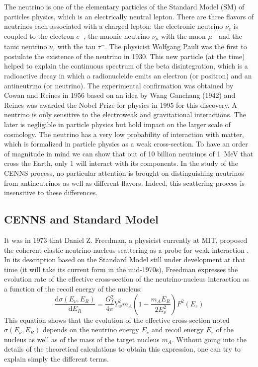 The neutrino is one of the elementary particles of the Standard Model (SM) of particles physics, which is an electrically neutral lepton. There are three flavors of neutrinos each associated with a charged lepton: the electronic neutrino $\nu_e$ is coupled to the electron $e^-$, the muonic neutrino $\nu_{\mu}$ with the muon $\mu^-$ and the tauic neutrino $\nu_{\tau}$ with the tau $\tau^-$.
The physicist Wolfgang Pauli was the first to postulate the existence of the neutrino in 1930. This new particle (at the time) helped to explain the continuous spectrum of the beta disintegration, which is a radioactive decay in which a radionucleide emits an electron (or positron) and an antineutrino (or neutrino).
The experimental confirmation was obtained by Cowan and Reines in 1956 based on an idea by Wang Ganchang (1942) and Reines was awarded the Nobel Prize for physics in 1995 for this discovery.
A neutrino is only sensitive to the electroweak and gravitational interactions. The later is negligible in particle physics but hold impact on the larger scale of cosmology. 
The neutrino has a very low probability of interaction with matter, which is formalized in particle physics as a weak cross-section. To have an order of magnitude in mind we can show that out of 10 billion neutrinos of \SI{1}{\mega\eV} that cross the Earth, only 1 will interact with its components.
In the study of the CENNS process, no particular attention is brought on distinguishing  neutrinos from antineutrinos as well as different flavors. Indeed, this scattering process is insensitive to these differences. 


\subsection{CENNS and Standard Model}

It was in 1973 that Daniel Z. Freedman, a physicist currently at MIT, proposed the coherent elastic neutrino-nucleus scattering as a probe for weak interaction \cite{Freedman:1973yd}.
 In its description based on the Standard Model still under development at that time (it will take its current form in the mid-1970s), Freedman expresses the evolution rate of the effective cross-section of the neutrino-nucleus interaction as a function of the recoil energy of the nucleus:
\begin{equation}
\label{eq:cenns-equation}
\frac{\mathrm{d} \sigma (E_{\nu}, E_R)}{\mathrm{d} E_R}
=
\frac{G_{f}^2}{4\pi}
Y_w^2  m_A
\left( 1 - \frac{m_A E_R}{2 E_{\nu}^2} \right)
F^2(E_r)
\end{equation}
This equation shows that the evolution of the effective cross-section noted $\sigma(E_{\nu} , {E_R} )$ depends on the neutrino energy $E_{\nu}$ and recoil energy $E_r$ of the nucleus as well as of the mass of the target nucleus $m_A$. Without going into the details of the theoretical calculations to obtain this expression, one can try to explain simply the different terms.

